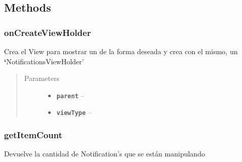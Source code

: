 \documentclass[letterpaper,10pt,english]{sphinxmanual}
\begin{document}
\subsection{Methods}
\label{Adapter/NotificationsAdapter:methods}

\subsubsection{onCreateViewHolder}
\label{Adapter/NotificationsAdapter:oncreateviewholder}

\begin{fulllineitems}
\label{Adapter/NotificationsAdapter:com.fiuba.tallerii.jobify.NotificationAdapter.onCreateViewHolder(ViewGroup, int)}
Crea el View para mostrar un  de la forma deseada y crea con el mismo, un {\color{red}\bfseries{}{}`}NotificationsViewHolder'
\begin{quote}\begin{description}
\item[{Parameters}] \leavevmode\begin{itemize}
\item {} 
\textbf{\texttt{parent}} -- 

\item {} 
\textbf{\texttt{viewType}} -- 

\end{itemize}

\end{description}\end{quote}

\end{fulllineitems}



\subsubsection{getItemCount}
\label{Adapter/NotificationsAdapter:getitemcount}

\begin{fulllineitems}
\label{Adapter/NotificationsAdapter:com.fiuba.tallerii.jobify.NotificationAdapter.getItemCount()}
Devuelve la cantidad de Notification's que se están manipulando

\end{fulllineitems}
\end{document}
